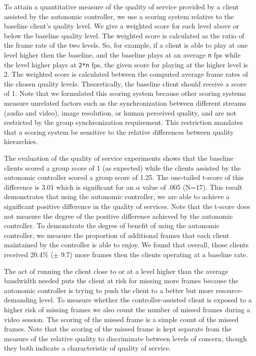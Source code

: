 \documentclass{sig-alternate}
\begin{document}
To attain a quantitative measure of the quality of service provided by
a client assisted by the autonomic controller, we use a scoring system
relative to the baseline client's quality level.  We give a weighted
score for each level above or below the baseline quality level.  The
weighted score is calculated as the ratio of the frame rate of the two
levels.  So, for example, if a client is able to play at one level
higher then the baseline, and the baseline plays at an average
\texttt{n} fps while the level higher plays at \texttt{2*n} fps, the
given score for playing at the higher level is 2.  The weighted score
is calculated between the computed average frame rates of the chosen
quality levels.  Theoretically, the baseline client should receive a
score of 1.  Note that we formulated this scoring system because other
scoring systems \cite{BAQAI,CORTE,CONWAY2000} measure unrelated
factors such as the synchronization between different streams (audio
and video), image resolution, or human perceived quality, and are not
restricted by the group synchronization requirement.  This restriction
mandates that a scoring system be sensitive to the relative
differences between quality hierarchies.

The evaluation of the quality of service experiments shows that the
baseline clients scored a group score of 1 (as expected) while the
clients assisted by the autonomic controller scored a group score of
1.25.  The one-tailed t-score of this difference is 3.01 which is
significant for an $\alpha$ value of .005 (N=17).  This result
demonstrates that using the autonomic controller, we are able to
achieve a significant positive difference in the quality of services.
Note that the t-score does not measure the degree of the positive
difference achieved by the autonomic controller.  To demonstrate the
degree of benefit of using the autonomic controller, we measure the
proportion of additional frames that each client maintained by the
controller is able to enjoy.  We found that overall, those clients
received 20.4\% ($\pm$ 9.7) more frames then the clients operating at
a baseline rate.

The act of running the client close to or at a level higher than the
average bandwidth needed puts the client at risk for missing more
frames because the autonomic controller is trying to push the client
to a better but more resource-demanding level.  To measure whether the
controller-assisted client is exposed to a higher risk of missing
frames we also count the number of missed frames during a video
session.  The scoring of the missed frame is a simple count of the
missed frames.  Note that the scoring of the missed frame is kept
separate from the measure of the relative quality to discriminate
between levels of concern, though they both indicate a characteristic
of quality of service.
\end{document}
